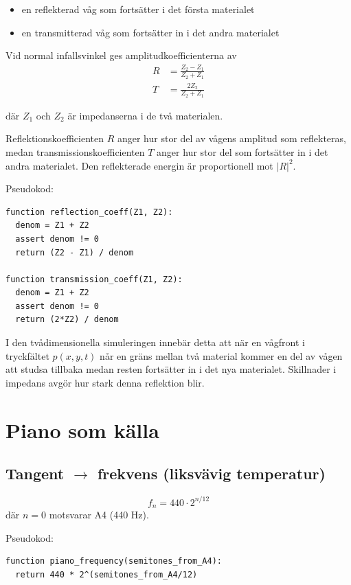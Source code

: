 \documentclass[11pt,a4paper]{article}
\begin{document}
\begin{itemize}
\item en reflekterad våg som fortsätter i det första materialet
\item en transmitterad våg som fortsätter in i det andra materialet
\end{itemize}

Vid normal infallsvinkel ges amplitudkoefficienterna av
\begin{align}
R &= \frac{Z_2 - Z_1}{Z_2 + Z_1} \\
T &= \frac{2Z_2}{Z_2 + Z_1}
\end{align}

där $Z_1$ och $Z_2$ är impedanserna i de två materialen.

Reflektionskoefficienten $R$ anger hur stor del av
vågens amplitud som reflekteras, medan
transmissionskoefficienten $T$ anger hur stor del
som fortsätter in i det andra materialet.
Den reflekterade energin är proportionell mot $|R|^2$.

Pseudokod:
\begin{lstlisting}[style=pseudocode]
function reflection_coeff(Z1, Z2):
  denom = Z1 + Z2
  assert denom != 0
  return (Z2 - Z1) / denom

function transmission_coeff(Z1, Z2):
  denom = Z1 + Z2
  assert denom != 0
  return (2*Z2) / denom
\end{lstlisting}

I den tvådimensionella simuleringen innebär detta att
när en vågfront i tryckfältet $p(x,y,t)$ når en gräns
mellan två material kommer en del av vågen att studsa
tillbaka medan resten fortsätter in i det nya materialet.
Skillnader i impedans avgör hur stark denna reflektion
blir.

\clearpage
\section{Piano som källa}
\subsection{Tangent $\rightarrow$ frekvens (liksvävig temperatur)}
\begin{equation}
f_n = 440 \cdot 2^{n/12}
\end{equation}
där $n=0$ motsvarar A4 (440 Hz).

Pseudokod:
\begin{lstlisting}[style=pseudocode]
function piano_frequency(semitones_from_A4):
  return 440 * 2^(semitones_from_A4/12)
\end{lstlisting}
\end{document}
